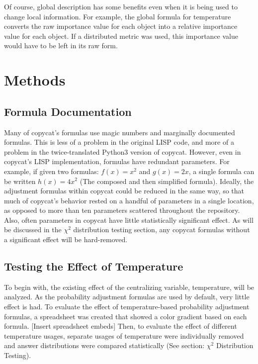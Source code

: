 \documentclass[a4paper]{article}
\begin{document}
    Of course, global description has some benefits even when it is being used to change local information.
    For example, the global formula for temperature converts the raw importance value for each object into a relative importance value for each object.
    If a distributed metric was used, this importance value would have to be left in its raw form.

\section{Methods}

    \subsection{Formula Documentation}

        Many of copycat's formulas use magic numbers and marginally documented formulas.
        This is less of a problem in the original LISP code, and more of a problem in the twice-translated Python3 version of copycat.
        However, even in copycat's LISP implementation, formulas have redundant parameters.
        For example, if given two formulas: $f(x) = x^2$ and $g(x) = 2x$, a single formula can be written $h(x) = 4x^2$ (The composed and then simplified formula).
        Ideally, the adjustment formulas within copycat could be reduced in the same way, so that much of copycat's behavior rested on a handful of parameters in a single location, as opposed to more than ten parameters scattered throughout the repository.
        Also, often parameters in copycat have little statistically significant effect.
        As will be discussed in the $\chi^2$ distribution testing section, any copycat formulas without a significant effect will be hard-removed.

    \subsection{Testing the Effect of Temperature}

        To begin with, the existing effect of the centralizing variable, temperature, will be analyzed.
        As the probability adjustment formulas are used by default, very little effect is had.
        To evaluate the effect of temperature-based probability adjustment formulas, a spreadsheet was created that showed a color gradient based on each formula.
        [Insert spreadsheet embeds]
        Then, to evaluate the effect of different temperature usages, separate usages of temperature were individually removed and answer distributions were compared statistically (See section: $\chi^2$ Distribution Testing).
\end{document}
